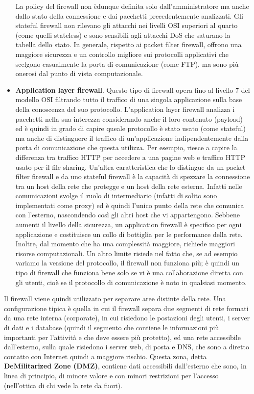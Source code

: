 \begin{itemize}
	La policy del firewall non èdunque definita solo dall'amministratore ma anche dallo stato della connessione e dai pacchetti precedentemente analizzati. Gli stateful firewall non rilevano gli attacchi nei livelli OSI superiori al quarto (come quelli stateless) e sono sensibili agli attacchi DoS che saturano la tabella dello stato. In generale, rispetto ai packet filter firewall, offrono una maggiore sicurezza e un controllo migliore sui protocolli applicativi che scelgono casualmente la porta di comunicazione (come FTP), ma sono più onerosi dal punto di vista computazionale.
	\item \textbf{Application layer firewall}. Questo tipo di firewall opera fino al livello 7 del modello OSI filtrando tutto il traffico di una singola applicazione sulla base della conoscenza del suo protocollo. L'application layer firewall analizza i pacchetti nella sua interezza considerando anche il loro contenuto (payload) ed è quindi in grado di capire queale protocollo è stato usato (come stateful) ma anche di distinguere il traffico di un'applicazione indipendentemente dalla porta di comunicazione che questa utilizza. Per esempio, riesce a capire la differenza tra traffico HTTP per accedere a una pagine web e traffico HTTP usato per il file sharing. Un'altra caratteristica che lo distingue da un packet filter firewall e da uno stateful firewall è la capacità di spezzare la connessione tra un host della rete che protegge e un host della rete esterna. Infatti nelle comunicazioni svolge il ruolo di intermediario (infatti di solito sono implementati come proxy) ed è quindi l'unico punto della rete che comunica con l'esterno, nascondendo così gli altri host che vi appartengono. Sebbene aumenti il livello della sicurezza, un application firewall è specifico per ogni applicazione e costituisce un collo di bottiglia per le performance della rete. Inoltre, dal momento che ha una complessità maggiore, richiede maggiori risorse computazionali. Un altro limite risiede nel fatto che, se ad esempio variamo la versione del protocollo, il firewall non funziona più; è quindi un tipo di firewall che funziona bene solo se vi è una collaborazione diretta con gli utenti, cioè se il protocollo di comunicazione è noto in qualsiasi momento.
\end{itemize}
Il firewall viene quindi utilizzato per separare aree distinte della rete. Una configurazione tipica è quella in cui il firewall separa due segmenti di rete formati da una rete interna (corporate), in cui risiedono le postazioni degli utenti, i server di dati e i database (quindi il segmento che contiene le informazioni più importanti per l'attività e che deve essere più protetto), ed una rete accessibile dall'esterno, sulla quale risiedono i server web, di posta e DNS, che sono a diretto contatto con Internet quindi a maggiore rischio. Questa zona, detta \textbf{DeMilitarized Zone (DMZ)}, contiene dati accessibili dall'esterno che sono, in linea di principio, di minore valore e con minori restrizioni per l'accesso (nell'ottica di chi vede la rete da fuori).\newpage
